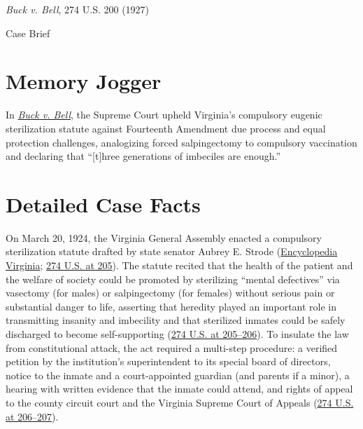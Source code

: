 \documentclass[12pt]{article}
\begin{document}
\begin{center}
{\LARGE \textit{Buck v. Bell}, 274 U.S. 200 (1927)\par}
\vspace{0.8em}
{\large Case Brief\par}
\end{center}
\vspace{1em}

\section{Memory Jogger}

In \href{https://www.courtlistener.com/opinion/101076/buck-v-bell/}{\textit{Buck v. Bell}}, the Supreme Court upheld Virginia's compulsory eugenic sterilization statute against Fourteenth Amendment due process and equal protection challenges, analogizing forced salpingectomy to compulsory vaccination and declaring that ``[t]hree generations of imbeciles are enough.''

\section{Detailed Case Facts}

On March 20, 1924, the Virginia General Assembly enacted a compulsory sterilization statute drafted by state senator Aubrey E. Strode (\href{https://encyclopediavirginia.org/entries/buck-v-bell-1927/}{Encyclopedia Virginia}; \href{https://supreme.justia.com/cases/federal/us/274/200/}{274 U.S. at 205}). The statute recited that the health of the patient and the welfare of society could be promoted by sterilizing ``mental defectives'' via vasectomy (for males) or salpingectomy (for females) without serious pain or substantial danger to life, asserting that heredity played an important role in transmitting insanity and imbecility and that sterilized inmates could be safely discharged to become self-supporting (\href{https://supreme.justia.com/cases/federal/us/274/200/}{274 U.S. at 205--206}). To insulate the law from constitutional attack, the act required a multi-step procedure: a verified petition by the institution's superintendent to its special board of directors, notice to the inmate and a court-appointed guardian (and parents if a minor), a hearing with written evidence that the inmate could attend, and rights of appeal to the county circuit court and the Virginia Supreme Court of Appeals (\href{https://supreme.justia.com/cases/federal/us/274/200/}{274 U.S. at 206--207}).
\end{document}

